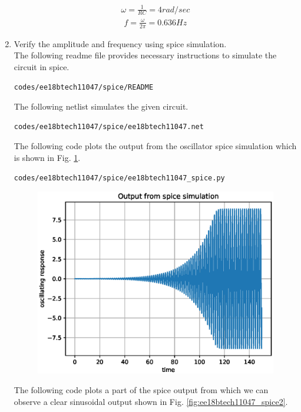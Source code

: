 \begin{enumerate}[label=\arabic*.,ref=\theenumi]
\begin{align}
\omega = \frac{1}{RC} = 4 rad/sec
\end{align}
\begin{align}
f = \frac{\omega }{2\pi} = 0.636 Hz
\end{align}
\item Verify the amplitude and frequency using spice simulation.\\
\solution The following readme file provides necessary instructions to simulate the circuit in spice.
\begin{lstlisting}
codes/ee18btech11047/spice/README
\end{lstlisting}
The following netlist simulates the given circuit.
\begin{lstlisting}
codes/ee18btech11047/spice/ee18btech11047.net
\end{lstlisting}
The following code plots the output from the oscillator spice simulation which is shown in Fig. \ref{fig:ee18btech11047_spice}.
\begin{lstlisting}
codes/ee18btech11047/spice/ee18btech11047_spice.py
\end{lstlisting}
\renewcommand{\thefigure}{\theenumi.\arabic{figure}}
%
\begin{figure}[!ht]
\centering
\includegraphics[width=\columnwidth]{./figs/ee18btech11047/ee18btech11047_spice.eps}
\caption{}
\label{fig:ee18btech11047_spice}
\end{figure}
%
The following code plots a part of the spice output from which we can observe a clear sinusoidal output shown in Fig. \ref{fig:ee18btech11047_spice2}.

\end{enumerate}
